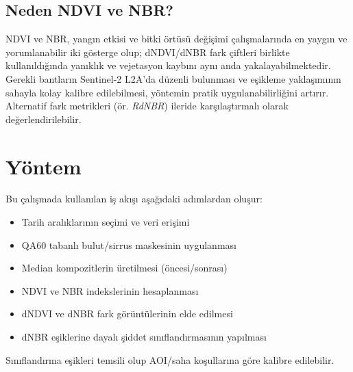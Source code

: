 \documentclass[11pt,a4paper]{article}
\begin{document}
\subsection*{Neden NDVI ve NBR?}
NDVI ve NBR, yangın etkisi ve bitki örtüsü değişimi çalışmalarında en yaygın ve yorumlanabilir iki gösterge olup; dNDVI/dNBR fark çiftleri birlikte kullanıldığında yanıklık ve vejetasyon kaybını aynı anda yakalayabilmektedir. Gerekli bantların Sentinel-2 L2A'da düzenli bulunması ve eşikleme yaklaşımının sahayla kolay kalibre edilebilmesi, yöntemin pratik uygulanabilirliğini artırır. Alternatif fark metrikleri (ör. \emph{RdNBR}) ileride karşılaştırmalı olarak değerlendirilebilir.

\clearpage
\section*{Yöntem}
Bu çalışmada kullanılan iş akışı aşağıdaki adımlardan oluşur:
\begin{itemize}
  \item Tarih aralıklarının seçimi ve veri erişimi
  \item QA60 tabanlı bulut/sirrus maskesinin uygulanması
  \item Median kompozitlerin üretilmesi (öncesi/sonrası)
  \item NDVI ve NBR indekslerinin hesaplanması
  \item dNDVI ve dNBR fark görüntülerinin elde edilmesi
  \item dNBR eşiklerine dayalı şiddet sınıflandırmasının yapılması
\end{itemize}
Sınıflandırma eşikleri temsili olup AOI/saha koşullarına göre kalibre edilebilir.
\end{document}
